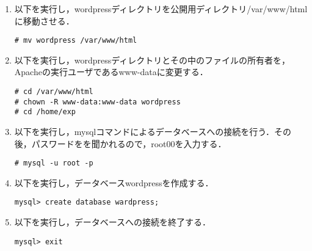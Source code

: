 \documentclass[a4j,titlepage]{jarticle}
\begin{document}
\begin{itemize}
\begin{enumerate}
\begin{enumerate}
\item 以下を実行し，wordpressディレクトリを公開用ディレクトリ/var/www/htmlに移動させる．
\begin{screen}
\begin{center}
\begin{verbatim}
# mv wordpress /var/www/html
\end{verbatim}
\end{center}
\end{screen}

\item 以下を実行し，wordpressディレクトリとその中のファイルの所有者を，Apacheの実行ユーザであるwww-dataに変更する．
\begin{screen}
\begin{center}
\begin{verbatim}
# cd /var/www/html
# chown -R www-data:www-data wordpress
# cd /home/exp
\end{verbatim}
\end{center}
\end{screen}

\item 以下を実行し，mysqlコマンドによるデータベースへの接続を行う．その後，パスワードをを聞かれるので，root00を入力する．
\begin{screen}
\begin{center}
\begin{verbatim}
# mysql -u root -p
\end{verbatim}
\end{center}
\end{screen}

\item 以下を実行し，データベースwordpressを作成する．
\begin{screen}
\begin{center}
\begin{verbatim}
mysql> create database wardpress;
\end{verbatim}
\end{center}
\end{screen}

\item 以下を実行し，データベースへの接続を終了する．
\begin{screen}
\begin{center}
\begin{verbatim}
mysql> exit
\end{verbatim}
\end{center}
\end{screen}


\end{enumerate}
\end{enumerate}
\end{itemize}
\end{document}
